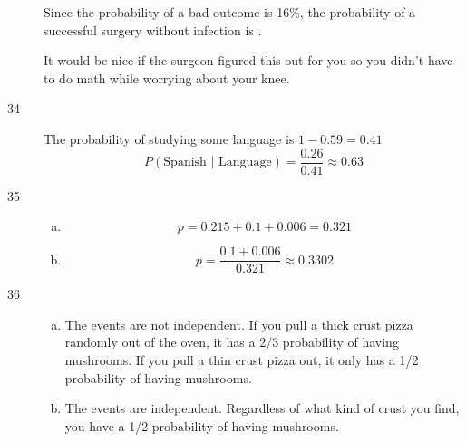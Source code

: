 \documentclass[letterpaper]{exam}
\begin{document}
\begin{description}
      Since the probability of a bad outcome is 16\%, the probability of a
      successful surgery without infection is .

      It would be nice if the surgeon figured this out for you so you didn't
      have to do math while worrying about your knee.


    \item[34]
      The probability of studying some language is $1 - 0.59 = 0.41$
      \[
        P(\text{Spanish } | \text{ Language}) = \frac{0.26}{0.41} 
          \approx \boxed{ 0.63 }
      \]

    \item[35]
      \begin{enumerate}[(a)]
        \item 
          \[
            p = 0.215 + 0.1 + 0.006 = \boxed{ 0.321 }
          \]

        \item
          \[
            p = \frac{0.1 + 0.006}{0.321} \approx \boxed{ 0.3302 }
          \]
      \end{enumerate}

    \item[36]
      \begin{enumerate}[(a)]
        \item The events are not independent. If you pull a thick crust pizza
          randomly out of the oven, it has a 2/3 probability of having
          mushrooms. If you pull a thin crust pizza out, it only has a 1/2
          probability of having mushrooms.

        \item The events are independent. Regardless of what kind of crust you
          find, you have a 1/2 probability of having mushrooms.
      \end{enumerate}





\end{description}
\end{document}
